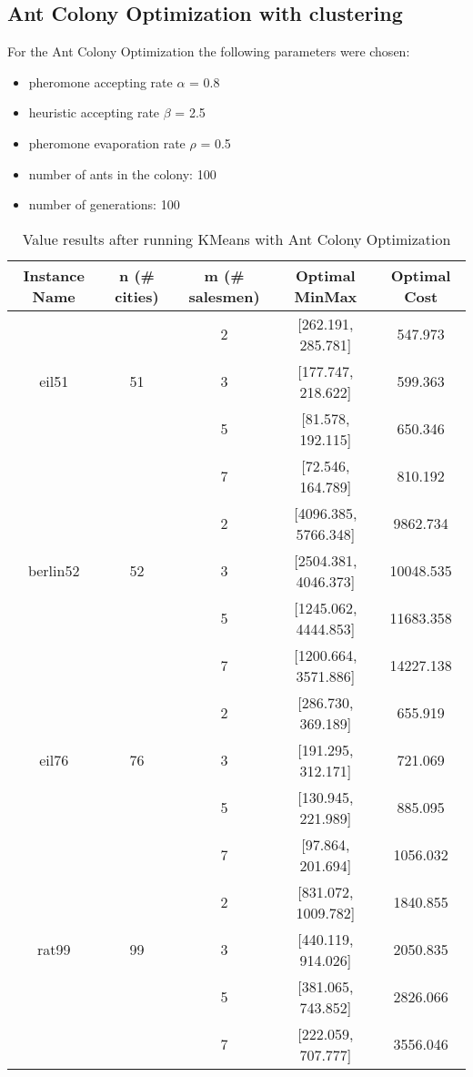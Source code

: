 \documentclass{article}
\begin{document}
\subsection{Ant Colony Optimization with clustering}
For the Ant Colony Optimization the following parameters were chosen:
\begin{itemize}
  \item pheromone accepting rate $\alpha$ = 0.8
  \item heuristic accepting rate $\beta$ = 2.5
  \item pheromone evaporation rate $\rho$ = 0.5
  \item number of ants in the colony: 100
  \item number of generations: 100
\end{itemize}

\begin{table}[h!]
\centering
\begin{tabular}{ |c|c|c|c|c| } 
\hline
Instance Name & n (\# cities) & m (\# salesmen) & Optimal MinMax & Optimal Cost\\
\hline
  &   & 2 & [262.191, 285.781] & 547.973 \\ 
eil51 & 51 & 3 & [177.747, 218.622] & 599.363 \\ 
  &   & 5 & [81.578, 192.115] & 650.346 \\ 
  &   & 7 & [72.546, 164.789] & 810.192 \\ 
\hline
  &   & 2 & [4096.385, 5766.348] & 9862.734 \\ 
berlin52 & 52 & 3 & [2504.381, 4046.373] & 10048.535 \\ 
  &   & 5 & [1245.062, 4444.853] & 11683.358 \\ 
  &   & 7 & [1200.664, 3571.886] & 14227.138 \\ 
\hline
  &   & 2 & [286.730, 369.189] & 655.919 \\ 
eil76 & 76 & 3 & [191.295, 312.171] & 721.069 \\ 
  &   & 5 & [130.945, 221.989] & 885.095 \\ 
  &   & 7 & [97.864, 201.694] & 1056.032 \\ 
\hline
  &   & 2 & [831.072, 1009.782] & 1840.855 \\ 
rat99 & 99 & 3 & [440.119, 914.026] & 2050.835 \\ 
  &   & 5 & [381.065, 743.852] & 2826.066 \\ 
  &   & 7 & [222.059, 707.777] & 3556.046 \\ 
\hline
\end{tabular}
\caption{Value results after running KMeans with Ant Colony Optimization}
\label{table:2}
\end{table}
\end{document}
